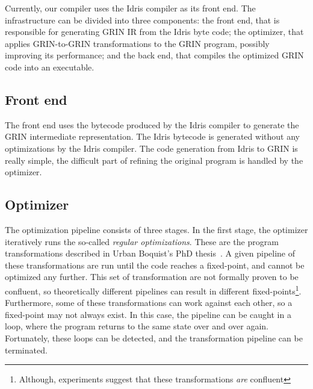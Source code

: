 \documentclass[main.tex]{subfiles}
\begin{document}
	
	Currently, our compiler uses the Idris compiler as its front end. The infrastructure can be divided into three components: the front end, that is responsible for generating GRIN IR from the Idris byte code; the optimizer, that applies GRIN-to-GRIN transformations to the GRIN program, possibly improving its performance; and the back end, that compiles the optimized GRIN code into an executable.
	
	\subsection{Front end}
	
	The front end uses the bytecode produced by the Idris compiler to generate the GRIN intermediate representation. The Idris bytecode is generated without any optimizations by the Idris compiler. The code generation from Idris to GRIN is really simple, the difficult part of refining the original program is handled by the optimizer. 
	
	\subsection{Optimizer}
	\label{subsec:optimizer}
	
	The optimization pipeline consists of three stages. In the first stage, the optimizer iteratively runs the so-called \textit{regular optimizations}. These are the program transformations described in Urban Boquist's PhD thesis~\cite{boquist-phd}. A given pipeline of these transformations are run until the code reaches a fixed-point, and cannot be optimized any further. This set of transformation are not formally proven to be confluent, so theoretically different pipelines can result in different fixed-points\footnote{Although, experiments suggest that these transformations \textit{are} confluent}. Furthermore, some of these transformations can work against each other, so a fixed-point may not always exist. In this case, the pipeline can be caught in a loop, where the program returns to the same state over and over again. Fortunately, these loops can be detected, and the transformation pipeline can be terminated. 
	
\end{document}
